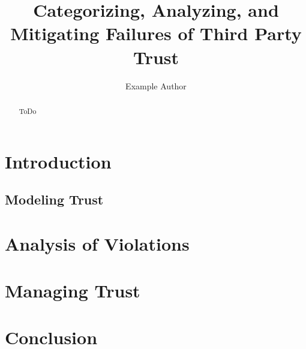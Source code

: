 \documentclass[11pt,letterpaper]{article}
\begin{document}
\title{Categorizing, Analyzing, and Mitigating Failures of Third Party Trust}

\author{Example Author}

\maketitle

\begin{abstract}
ToDo
\end{abstract}

\section{Introduction}
\label{sec:intro}

\subsection{Modeling Trust}
\label{sec:model}

\section{Analysis of Violations}
\label{sec:violations}

\section{Managing Trust}
\label{sec:mitigation}

\section{Conclusion}
\label{sec:conclusion}



\end{document}
